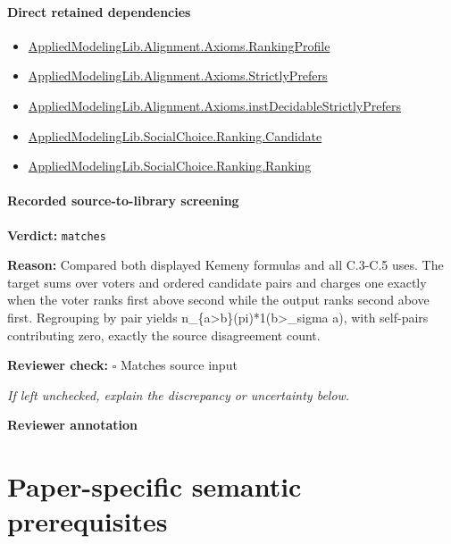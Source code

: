 \documentclass[10pt]{article}
\newcommand{\reviewerbox}{%
  \par\noindent\fbox{\parbox{0.96\linewidth}{\rule{0pt}{0.38in}}}\par
}
\newcommand{\reviewmatch}[1]{%
  \par\noindent\textbf{Reviewer check:} $\square$\; #1\par
  \noindent\emph{If left unchecked, explain the discrepancy or uncertainty below.}\par
}
\begin{document}
\paragraph{Direct retained dependencies}
\begin{itemize}\raggedright
\item \hyperlink{library-prerequisite-9bded048a60dfe0a}{Applied\allowbreak{}Modeling\allowbreak{}Lib.\allowbreak{}Alignment.\allowbreak{}Axioms.\allowbreak{}Ranking\allowbreak{}Profile}
\item \hyperlink{library-prerequisite-191720c2353b55e9}{Applied\allowbreak{}Modeling\allowbreak{}Lib.\allowbreak{}Alignment.\allowbreak{}Axioms.\allowbreak{}Strictly\allowbreak{}Prefers}
\item \hyperlink{governing-declaration-b77c4838760c68c9}{Applied\allowbreak{}Modeling\allowbreak{}Lib.\allowbreak{}Alignment.\allowbreak{}Axioms.\allowbreak{}inst\allowbreak{}Decidable\allowbreak{}Strictly\allowbreak{}Prefers}
\item \hyperlink{library-prerequisite-8c0e6c25845ae78a}{Applied\allowbreak{}Modeling\allowbreak{}Lib.\allowbreak{}Social\allowbreak{}Choice.\allowbreak{}Ranking.\allowbreak{}Candidate}
\item \hyperlink{library-prerequisite-5cde54446d1ae021}{Applied\allowbreak{}Modeling\allowbreak{}Lib.\allowbreak{}Social\allowbreak{}Choice.\allowbreak{}Ranking.\allowbreak{}Ranking}
\end{itemize}
\paragraph{Recorded source-to-library screening}
\textbf{Verdict:} \texttt{matches}
\\
{\raggedright
\textbf{Reason:} Compared both displayed Kemeny formulas and all C.\allowbreak{}3-\allowbreak{}C.\allowbreak{}5 uses.\allowbreak{} The target sums over voters and ordered candidate pairs and charges one exactly when the voter ranks first above second while the output ranks second above first.\allowbreak{} Regrouping by pair yields n\_\allowbreak{}\{a>b\}(pi)*1(b>\_\allowbreak{}sigma a), with self-\allowbreak{}pairs contributing zero, exactly the source disagreement count.\allowbreak{}
\par}
\reviewmatch{Matches source input}
\noindent\textbf{Reviewer annotation}\par
\reviewerbox
\clearpage
\hypertarget{paper-prerequisite-section-5ef5ef0364b6939c}{}
\section*{Paper-specific semantic prerequisites}
\hypertarget{paper-prerequisite-6a5d377445150f2f}{}
\end{document}
